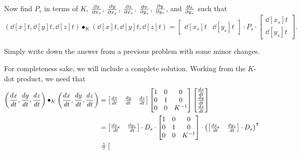 \documentclass{ximera}
\begin{document}
\begin{problem}
  Now find $P_s$ in terms of $K$, $\pp[x]{x_s}$, $\pp[y]{x_s}$,
  $\pp[z]{x_s}$, $\pp[x]{y_s}$, $\pp[y]{y_s}$, and $\pp[z]{y_s}$ such
  that
  \[
  \left(\dd[x]{t}, \dd[y]{t}, \dd[z]{t}\right)\bullet_K
  \left(\dd[x]{t}, \dd[y]{t}, \dd[z]{t}\right)
  =
  \begin{bmatrix}
    \dd[x_s]{t} &  \dd[y_s]{t}
  \end{bmatrix}
  \cdot P_s
  \cdot
  \begin{bmatrix}
    \dd[x_s]{t} \\  \dd[y_s]{t}
  \end{bmatrix}.
  \]
  \begin{hint}
  Simply write down the answer from a previous problem with some minor
  changes.
  \end{hint}
  \begin{freeResponse}
    For completeness sake, we will include a complete solution.
    Working from the $K$-dot product, we need that
    \begin{align*}
    \left(\dd[x]{t}, \dd[y]{t}, \dd[z]{t}\right)\bullet_K
    \left(\dd[x]{t}, \dd[y]{t}, \dd[z]{t}\right)
    &=
    \begin{bmatrix}
      \dd[x]{t} & \dd[y]{t} & \dd[z]{t}
    \end{bmatrix}
    \begin{bmatrix}
      1 & 0 & 0\\
      0 & 1 & 0\\
      0 & 0 & K^{-1}
    \end{bmatrix}
    \begin{bmatrix}
      \dd[x]{t} \\ \dd[y]{t} \\ \dd[z]{t}
    \end{bmatrix}\\
    &=
    \begin{bmatrix}
      \frac{dx_s}{dt} & \frac{dy_s}{dt}
    \end{bmatrix}\cdot D_{s}\cdot
    \begin{bmatrix}
      1 & 0 & 0\\
      0 & 1 & 0\\
    0 & 0 & K^{-1}
    \end{bmatrix}
    \cdot
    \left(
    \begin{bmatrix}
      \frac{dx_s}{dt} & \frac{dy_s}{dt}
    \end{bmatrix}\cdot D_{s}
    \right)^\transpose\\
    &=
    \begin{bmatrix}

\end{bmatrix}
\end{align*}
\end{freeResponse}
\end{problem}
\end{document}
